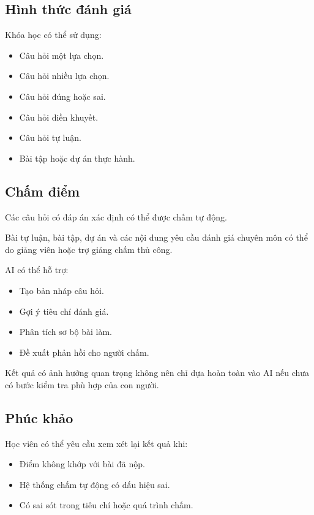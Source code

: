 \documentclass[12pt,a4paper]{article}
\begin{document}
\subsection{Hình thức đánh giá}

Khóa học có thể sử dụng:

\begin{itemize}
    \item Câu hỏi một lựa chọn.
    \item Câu hỏi nhiều lựa chọn.
    \item Câu hỏi đúng hoặc sai.
    \item Câu hỏi điền khuyết.
    \item Câu hỏi tự luận.
    \item Bài tập hoặc dự án thực hành.
\end{itemize}

\subsection{Chấm điểm}

Các câu hỏi có đáp án xác định có thể được chấm tự động.

Bài tự luận, bài tập, dự án và các nội dung yêu cầu đánh giá chuyên môn
có thể do giảng viên hoặc trợ giảng chấm thủ công.

AI có thể hỗ trợ:

\begin{itemize}
    \item Tạo bản nháp câu hỏi.
    \item Gợi ý tiêu chí đánh giá.
    \item Phân tích sơ bộ bài làm.
    \item Đề xuất phản hồi cho người chấm.
\end{itemize}

Kết quả có ảnh hưởng quan trọng không nên chỉ dựa hoàn toàn vào AI
nếu chưa có bước kiểm tra phù hợp của con người.

\subsection{Phúc khảo}

Học viên có thể yêu cầu xem xét lại kết quả khi:

\begin{itemize}
    \item Điểm không khớp với bài đã nộp.
    \item Hệ thống chấm tự động có dấu hiệu sai.
    \item Có sai sót trong tiêu chí hoặc quá trình chấm.
\end{itemize}
\end{document}
